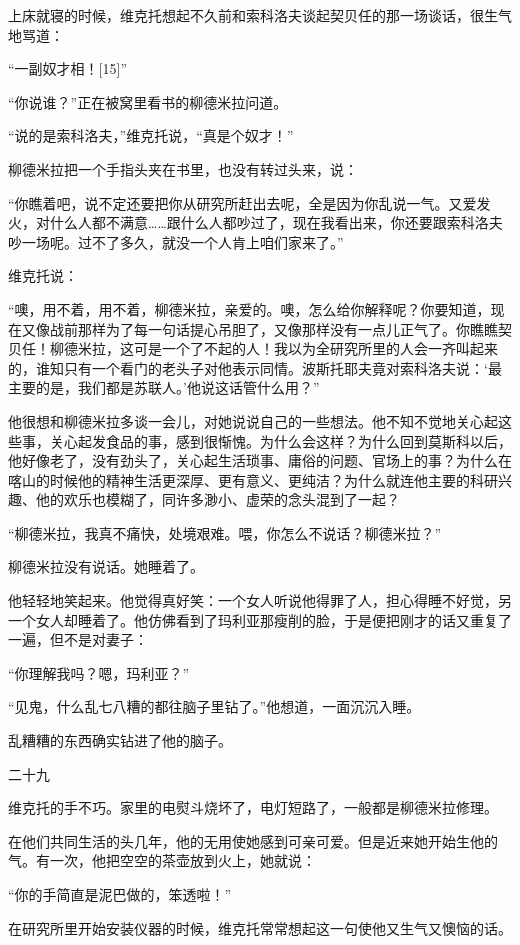 上床就寝的时候，维克托想起不久前和索科洛夫谈起契贝任的那一场谈话，很生气地骂道：

“一副奴才相！[15]”

“你说谁？”正在被窝里看书的柳德米拉问道。

“说的是索科洛夫，”维克托说，“真是个奴才！”

柳德米拉把一个手指头夹在书里，也没有转过头来，说：

“你瞧着吧，说不定还要把你从研究所赶出去呢，全是因为你乱说一气。又爱发火，对什么人都不满意……跟什么人都吵过了，现在我看出来，你还要跟索科洛夫吵一场呢。过不了多久，就没一个人肯上咱们家来了。”

维克托说：

“噢，用不着，用不着，柳德米拉，亲爱的。噢，怎么给你解释呢？你要知道，现在又像战前那样为了每一句话提心吊胆了，又像那样没有一点儿正气了。你瞧瞧契贝任！柳德米拉，这可是一个了不起的人！我以为全研究所里的人会一齐叫起来的，谁知只有一个看门的老头子对他表示同情。波斯托耶夫竟对索科洛夫说：‘最主要的是，我们都是苏联人。’他说这话管什么用？”

他很想和柳德米拉多谈一会儿，对她说说自己的一些想法。他不知不觉地关心起这些事，关心起发食品的事，感到很惭愧。为什么会这样？为什么回到莫斯科以后，他好像老了，没有劲头了，关心起生活琐事、庸俗的问题、官场上的事？为什么在喀山的时候他的精神生活更深厚、更有意义、更纯洁？为什么就连他主要的科研兴趣、他的欢乐也模糊了，同许多渺小、虚荣的念头混到了一起？

“柳德米拉，我真不痛快，处境艰难。喂，你怎么不说话？柳德米拉？”

柳德米拉没有说话。她睡着了。

他轻轻地笑起来。他觉得真好笑：一个女人听说他得罪了人，担心得睡不好觉，另一个女人却睡着了。他仿佛看到了玛利亚那瘦削的脸，于是便把刚才的话又重复了一遍，但不是对妻子：

“你理解我吗？嗯，玛利亚？”

“见鬼，什么乱七八糟的都往脑子里钻了。”他想道，一面沉沉入睡。

乱糟糟的东西确实钻进了他的脑子。

二十九

维克托的手不巧。家里的电熨斗烧坏了，电灯短路了，一般都是柳德米拉修理。

在他们共同生活的头几年，他的无用使她感到可亲可爱。但是近来她开始生他的气。有一次，他把空空的茶壶放到火上，她就说：

“你的手简直是泥巴做的，笨透啦！”

在研究所里开始安装仪器的时候，维克托常常想起这一句使他又生气又懊恼的话。

